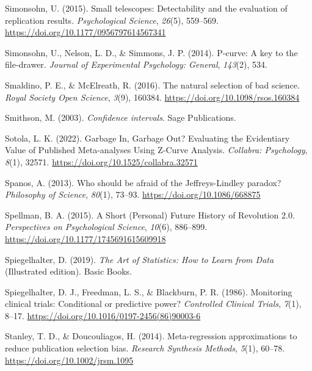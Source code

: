 \documentclass[
  oneside]{krantz}
\newlength{\cslhangindent}
\newlength{\cslentryspacingunit} %
\newenvironment{CSLReferences}[2] %
 {%
  \setlength{\parindent}{0pt}
  \ifodd #1
  \let\oldpar\par
  \def\par{\hangindent=\cslhangindent\oldpar}
  \fi
  \setlength{\parskip}{#2\cslentryspacingunit}
 }%
 {}
\begin{document}
\begin{CSLReferences}{1}{0}
\leavevmode{}%
Simonsohn, U. (2015). Small telescopes: {Detectability} and the
evaluation of replication results. \emph{Psychological Science},
\emph{26}(5), 559--569. \url{https://doi.org/10.1177/0956797614567341}

\leavevmode{}%
Simonsohn, U., Nelson, L. D., \& Simmons, J. P. (2014). P-curve: {A} key
to the file-drawer. \emph{Journal of Experimental Psychology: General},
\emph{143}(2), 534.

\leavevmode{}%
Smaldino, P. E., \& McElreath, R. (2016). The natural selection of bad
science. \emph{Royal Society Open Science}, \emph{3}(9), 160384.
\url{https://doi.org/10.1098/rsos.160384}

\leavevmode{}%
Smithson, M. (2003). \emph{Confidence intervals}. {Sage Publications}.

\leavevmode{}%
Sotola, L. K. (2022). Garbage {In}, {Garbage Out}? {Evaluating} the
{Evidentiary Value} of {Published Meta-analyses Using Z-Curve Analysis}.
\emph{Collabra: Psychology}, \emph{8}(1), 32571.
\url{https://doi.org/10.1525/collabra.32571}

\leavevmode{}%
Spanos, A. (2013). Who should be afraid of the {Jeffreys-Lindley}
paradox? \emph{Philosophy of Science}, \emph{80}(1), 73--93.
\url{https://doi.org/10.1086/668875}

\leavevmode{}%
Spellman, B. A. (2015). A {Short} ({Personal}) {Future History} of
{Revolution} 2.0. \emph{Perspectives on Psychological Science},
\emph{10}(6), 886--899. \url{https://doi.org/10.1177/1745691615609918}

\leavevmode{}%
Spiegelhalter, D. (2019). \emph{The {Art} of {Statistics}: {How} to
{Learn} from {Data}} (Illustrated edition). {Basic Books}.

\leavevmode{}%
Spiegelhalter, D. J., Freedman, L. S., \& Blackburn, P. R. (1986).
Monitoring clinical trials: Conditional or predictive power?
\emph{Controlled Clinical Trials}, \emph{7}(1), 8--17.
\url{https://doi.org/10.1016/0197-2456(86)90003-6}

\leavevmode{}%
Stanley, T. D., \& Doucouliagos, H. (2014). Meta-regression
approximations to reduce publication selection bias. \emph{Research
Synthesis Methods}, \emph{5}(1), 60--78.
\url{https://doi.org/10.1002/jrsm.1095}


\end{CSLReferences}
\end{document}
